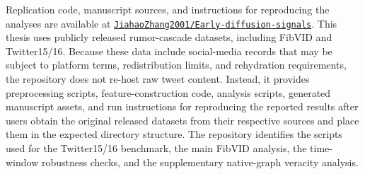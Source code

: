 Replication code, manuscript sources, and instructions for reproducing the analyses are available at
\href{https://github.com/JiahaoZhang2001/Early-diffusion-signals.git}{\texttt{JiahaoZhang2001/Early-diffusion-signals}}.
This thesis uses publicly released rumor-cascade datasets, including FibVID and Twitter15/16. Because these data include social-media records that may be subject to platform terms, redistribution limits, and rehydration requirements, the repository does not re-host raw tweet content. Instead, it provides preprocessing scripts, feature-construction code, analysis scripts, generated manuscript assets, and run instructions for reproducing the reported results after users obtain the original released datasets from their respective sources and place them in the expected directory structure.
The repository identifies the scripts used for the Twitter15/16 benchmark, the main FibVID analysis, the time-window robustness checks, and the supplementary native-graph veracity analysis.
